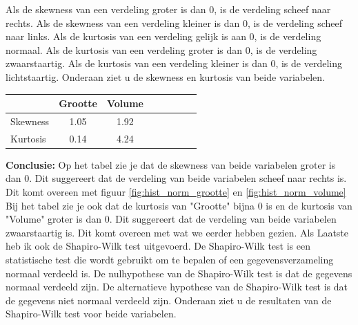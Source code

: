 \documentclass[12pt]{article}
\begin{document}
Als de skewness van een verdeling groter is dan 0, is de verdeling scheef naar rechts.
Als de skewness van een verdeling kleiner is dan 0, is de verdeling scheef naar links.
\newline\newline
Als de kurtosis van een verdeling gelijk is aan 0, is de verdeling normaal.
Als de kurtosis van een verdeling groter is dan 0, is de verdeling zwaarstaartig.
Als de kurtosis van een verdeling kleiner is dan 0, is de verdeling lichtstaartig.
\newline\newline
Onderaan ziet u de skewness en kurtosis van beide variabelen.
\newline\newline
\begin{tabular}{l*{6}{c}r}
    & Grootte & Volume \\
    \hline
    Skewness & 1.05 & 1.92 \\
    Kurtosis & 0.14 & 4.24 \\
\end{tabular}
\newline\newline\newline
\textbf{Conclusie:} Op het tabel zie je dat de skewness van beide variabelen groter is dan 0.
Dit suggereert dat de verdeling van beide variabelen scheef naar rechts is.
Dit komt overeen met figuur \ref{fig:hist_norm_grootte} en \ref{fig:hist_norm_volume}
\newline\newline
Bij het tabel zie je ook dat de kurtosis van "Grootte" bijna 0 is en de kurtosis van "Volume" groter is dan 0.
Dit suggereert dat de verdeling van beide variabelen zwaarstaartig is.
Dit komt overeen met wat we eerder hebben gezien.
\newline\newline
Als Laatste heb ik ook de Shapiro-Wilk test uitgevoerd.
De Shapiro-Wilk test is een statistische test die wordt gebruikt om te bepalen of een gegevensverzameling normaal verdeeld is.
\newline\newline
De nulhypothese van de Shapiro-Wilk test is dat de gegevens normaal verdeeld zijn.
De alternatieve hypothese van de Shapiro-Wilk test is dat de gegevens niet normaal verdeeld zijn.
\newline\newline
Onderaan ziet u de resultaten van de Shapiro-Wilk test voor beide variabelen.
\end{document}
